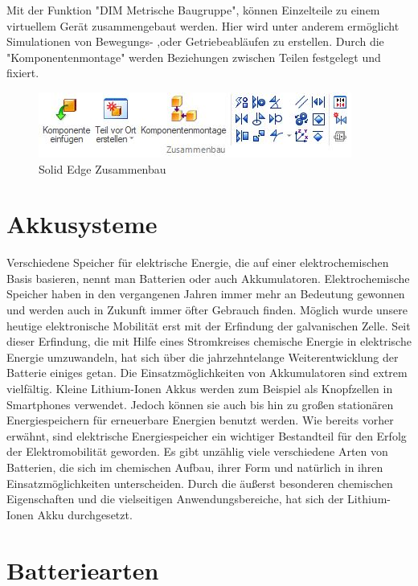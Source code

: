Mit der Funktion "DIM Metrische Baugruppe", können Einzelteile zu einem virtuellem Gerät zusammengebaut werden. Hier wird unter anderem ermöglicht Simulationen von Bewegungs- ,oder Getriebeabläufen zu erstellen. Durch die "Komponentenmontage" werden Beziehungen zwischen Teilen festgelegt und fixiert.

\begin{figure} [H]
	\begin{center}
		\includegraphics[scale=0.5]{figures/mechanik/Solid Edge_Zusammenbau.jpg}
			\caption{Solid Edge Zusammenbau}
			\label{fig:Solid Edge Zusammenbau}
	\end{center}
\end{figure}
\newpage


\section{Akkusysteme}
Verschiedene Speicher für elektrische Energie, die auf einer elektrochemischen Basis basieren, nennt man Batterien oder auch Akkumulatoren. Elektrochemische Speicher haben in den vergangenen Jahren immer mehr an Bedeutung gewonnen und werden auch in Zukunft immer öfter Gebrauch finden. Möglich wurde unsere heutige elektronische Mobilität erst mit der Erfindung der galvanischen Zelle. Seit dieser Erfindung, die mit Hilfe eines Stromkreises chemische Energie in elektrische Energie umzuwandeln, hat sich über die jahrzehntelange Weiterentwicklung der Batterie einiges getan. Die Einsatzmöglichkeiten von Akkumulatoren sind extrem vielfältig. Kleine Lithium-Ionen Akkus werden zum Beispiel als Knopfzellen in Smartphones verwendet. Jedoch können sie auch bis hin zu großen stationären Energiespeichern für erneuerbare Energien benutzt werden. Wie bereits vorher erwähnt, sind elektrische Energiespeicher ein wichtiger Bestandteil für den Erfolg der Elektromobilität geworden. Es gibt unzählig viele verschiedene Arten von Batterien, die sich im chemischen Aufbau, ihrer Form und natürlich in ihren Einsatzmöglichkeiten unterscheiden. Durch die äußerst besonderen chemischen Eigenschaften und die vielseitigen Anwendungsbereiche, hat sich der Lithium-Ionen Akku durchgesetzt.
\newpage

\section{Batteriearten}

